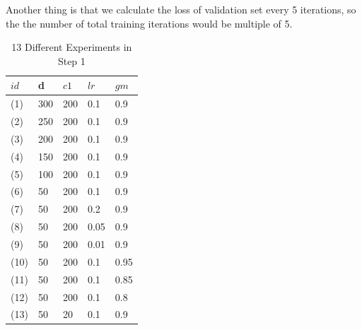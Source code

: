 Another thing is that we calculate the loss of validation set every 5 iterations, so the the number of total training iterations would be multiple of 5.


\begin{table}[tb] 
\caption{13 Different Experiments in Step 1} \label{tab:experiment13}
\begin{center}
\begin{tabular}{|l|l|l|l|l|}
\hline
$id$&\gls{d}&$c1$&$lr$&$gm$ \\ \hline
(1) 	& 300	&  200  	& 0.1		& 0.9	\\ \hline
(2) 	& 250	&  200 	& 0.1		& 0.9	\\ \hline
(3) 	& 200  	&  200 	& 0.1		& 0.9	\\ \hline
(4) 	& 150  	&  200 	& 0.1		& 0.9	\\ \hline
(5) 	& 100  	&  200 	& 0.1		& 0.9	\\ \hline
(6) 	& 50 	&  200 	& 0.1		& 0.9	\\ \hline
(7) 	& 50 	&  200 	& 0.2		& 0.9	\\ \hline
(8) 	& 50 	&  200 	& 0.05		& 0.9	\\ \hline
(9) 	& 50 	&  200 	& 0.01		& 0.9	\\ \hline
(10) 	& 50 	&  200 	& 0.1		& 0.95	\\ \hline
(11) 	& 50 	&  200 	& 0.1		& 0.85	\\ \hline
(12) 	& 50 	&  200 	& 0.1		& 0.8	\\ \hline
(13)	& 50		&  20	& 0.1		& 0.9	\\ \hline
\end{tabular}
\end{center}
\end{table}


